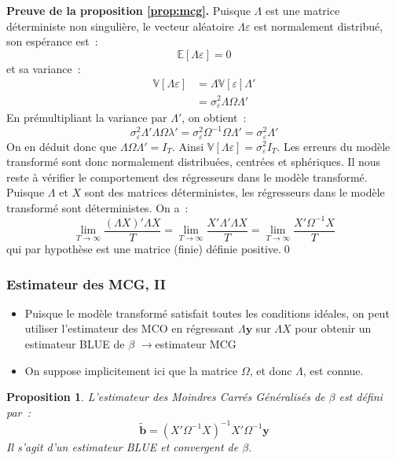 \documentclass[10pt]{beamer}
\theoremstyle{plain}
\newtheorem{prop}{Proposition}
\begin{document}
\begin{notes}

  \textbf{Preuve de la proposition \ref{prop:mcg}.} Puisque $\Lambda$ est une matrice déterministe non singulière, le vecteur aléatoire $\Lambda\varepsilon$ est normalement distribué, son espérance est~:
  \[
    \mathbb E [\Lambda\varepsilon] = 0
  \]
  et sa variance~:
  \[
    \begin{split}
      \mathbb V[\Lambda\varepsilon] &= \Lambda \mathbb V[\varepsilon] \Lambda'\\
      &= \sigma_{\varepsilon}^2 \Lambda \Omega \Lambda'
    \end{split}
  \]
  En prémultipliant la variance par $\Lambda'$, on obtient~:
  \[
    \sigma_{\varepsilon}^2\Lambda'\Lambda \Omega\lambda' = \sigma_{\varepsilon}^2\Omega^{-1}\Omega \Lambda' = \sigma_{\varepsilon}^2\Lambda'
  \]
  On en déduit donc que $\Lambda \Omega \Lambda' = I_T$. Ainsi $\mathbb V [\Lambda\varepsilon] = \sigma_{\varepsilon}^2I_T$. Les erreurs du modèle transformé sont donc normalement distribuées, centrées et sphériques. Il nous reste à vérifier le comportement des régresseurs dans le modèle transformé. Puisque $\Lambda$ et $X$ sont des matrices déterministes, les régresseurs dans le modèle transformé sont déterministes. On a~:
  \[
    \lim_{T\rightarrow\infty}\frac{(\Lambda X)'\Lambda X}{T} = \lim_{T\rightarrow\infty}\frac{X'\Lambda'\Lambda X}{T} = \lim_{T\rightarrow\infty}\frac{X'\Omega^{-1} X}{T}
  \]
  qui par hypothèse est une matrice (finie) définie positive.\qed
\end{notes}


\begin{frame}
  \frametitle{Estimateur des MCG, II}

  \begin{itemize}

  \item Puisque le modèle transformé satisfait toutes les conditions idéales, on peut utiliser l'estimateur des MCO en régressant $\Lambda \mathbf y$ sur $\Lambda X$ pour obtenir un estimateur BLUE de $\beta$ $\rightarrow$estimateur MCG\newline

  \item On suppose implicitement ici que la matrice $\Omega$, et donc $\Lambda$, est connue.\newline

  \end{itemize}


  \begin{prop}\label{prop:mcg:def}
    L'estimateur des Moindres Carrés Généralisés de $\beta$ est défini par~:
    \[
      \tilde{\textbf{b}} = (X'\Omega^{-1}X)^{-1}X'\Omega^{-1}\mathbf y
    \]
    Il s'agit d'un estimateur BLUE et convergent de $\beta$.
  \end{prop}


\end{frame}
\end{document}
